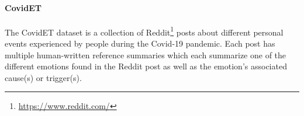 \documentclass[11pt]{article}
\begin{document}
\begin{table}[t]
    \centering
    \caption{Summary statistics for each of the datasets. Test size refers to the number of unique source text-information request pairs in the test set of each dataset and the average length refers to the average space-separated string lengths of different dataset fields.}
    \label{tab:summ_stats}
\end{table}

\paragraph{CovidET} The CovidET dataset \citep{zhan-etal-2022-feel} is a collection of Reddit\footnote{\url{https://www.reddit.com/}} posts about different personal events experienced by people during the Covid-19 pandemic. Each post has multiple human-written reference summaries which each summarize one of the different emotions found in the Reddit post as well as the emotion's associated cause(s) or trigger(s).
\end{document}
